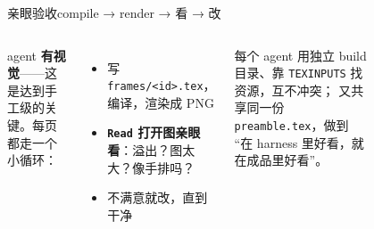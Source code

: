 \begin{frame}{亲眼验收}{compile → render → 看 → 改}
  \begin{columns}[T,onlytextwidth]
      agent \textbf{有视觉}——这是达到手工级的关键。每页都走一个小循环：
      \begin{itemize}
        \item 写 \texttt{frames/<id>.tex}，编译，渲染成 PNG
        \item \textbf{\texttt{Read} 打开图亲眼看}：溢出？图太大？像手排吗？
        \item 不满意就改，直到干净
      \end{itemize}
      \medskip
      每个 agent 用\alert{独立 build 目录}、靠 \texttt{TEXINPUTS} 找资源，互不冲突；
      又共享同一份 \texttt{preamble.tex}，做到 \alert{“在 harness 里好看，就在成品里好看”}。
      \begin{figure}\centering
        \resizebox{\textwidth}{!}{}
      \end{figure}
  \end{columns}
\end{frame}
